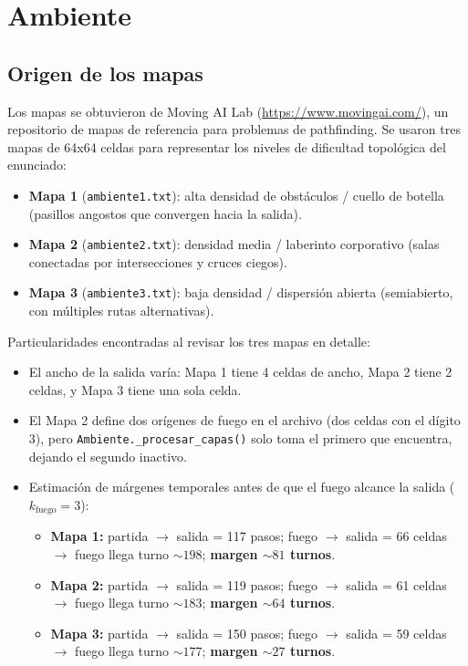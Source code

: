 \documentclass[11pt,a4paper]{article}
\begin{document}
\section{Ambiente}
\label{sec:ambiente}

\subsection{Origen de los mapas}
Los mapas se obtuvieron de Moving AI Lab (\url{https://www.movingai.com/}), un repositorio de mapas de referencia para problemas de pathfinding. Se usaron tres mapas de 64x64 celdas para representar los niveles de dificultad topológica del enunciado:
\begin{itemize}
    \item \textbf{Mapa 1} (\texttt{ambiente1.txt}): alta densidad de obstáculos / cuello de botella (pasillos angostos que convergen hacia la salida).
    \item \textbf{Mapa 2} (\texttt{ambiente2.txt}): densidad media / laberinto corporativo (salas conectadas por intersecciones y cruces ciegos).
    \item \textbf{Mapa 3} (\texttt{ambiente3.txt}): baja densidad / dispersión abierta (semiabierto, con múltiples rutas alternativas).
\end{itemize}

Particularidades encontradas al revisar los tres mapas en detalle:
\begin{itemize}
    \item El ancho de la salida varía: Mapa 1 tiene 4 celdas de ancho, Mapa 2 tiene 2 celdas, y Mapa 3 tiene una sola celda.
    \item El Mapa 2 define dos orígenes de fuego en el archivo (dos celdas con el dígito 3), pero \texttt{Ambiente.\_procesar\_capas()} solo toma el primero que encuentra, dejando el segundo inactivo.
    \item Estimación de márgenes temporales antes de que el fuego alcance la salida ($k_{\text{fuego}}=3$):
    \begin{itemize}
        \item \textbf{Mapa 1:} partida $\rightarrow$ salida = 117 pasos; fuego $\rightarrow$ salida = 66 celdas $\rightarrow$ fuego llega turno $\sim 198$; \textbf{margen $\sim 81$ turnos}.
        \item \textbf{Mapa 2:} partida $\rightarrow$ salida = 119 pasos; fuego $\rightarrow$ salida = 61 celdas $\rightarrow$ fuego llega turno $\sim 183$; \textbf{margen $\sim 64$ turnos}.
        \item \textbf{Mapa 3:} partida $\rightarrow$ salida = 150 pasos; fuego $\rightarrow$ salida = 59 celdas $\rightarrow$ fuego llega turno $\sim 177$; \textbf{margen $\sim 27$ turnos}.
    \end{itemize}
\end{itemize}
\end{document}
